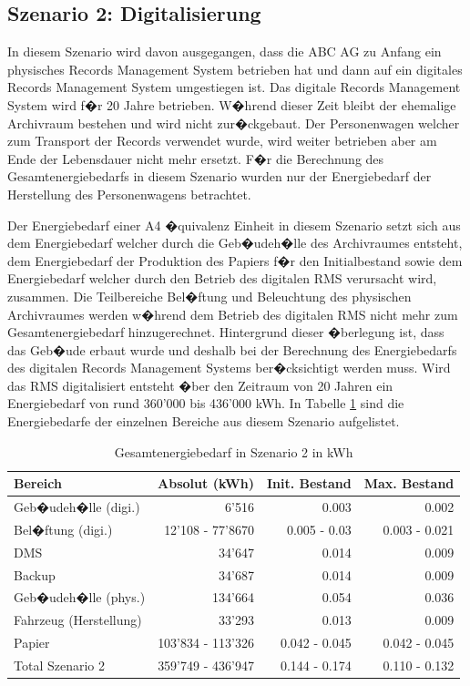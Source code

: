\documentclass[a4paper,twoside,10pt]{report}
\begin{document}
\subsection{Szenario 2: Digitalisierung}
In diesem Szenario wird davon ausgegangen, dass die ABC AG zu Anfang ein physisches Records Management System betrieben hat und dann auf ein digitales Records Management System umgestiegen ist. Das digitale Records Management System wird f�r 20 Jahre betrieben. W�hrend dieser Zeit bleibt der ehemalige Archivraum bestehen und wird nicht zur�ckgebaut. Der Personenwagen welcher zum Transport der Records verwendet wurde, wird weiter betrieben aber am Ende der Lebensdauer nicht mehr ersetzt. F�r die Berechnung des Gesamtenergiebedarfs in diesem Szenario wurden nur der Energiebedarf der Herstellung des Personenwagens betrachtet.

Der Energiebedarf einer A4 �quivalenz Einheit in diesem Szenario setzt sich aus dem Energiebedarf welcher durch die Geb�udeh�lle des Archivraumes entsteht, dem Energiebedarf der Produktion des Papiers f�r den Initialbestand sowie dem Energiebedarf welcher durch den Betrieb des digitalen \ac{RMS} verursacht wird, zusammen. Die Teilbereiche Bel�ftung und Beleuchtung des physischen Archivraumes werden w�hrend dem Betrieb des digitalen \ac{RMS} nicht mehr zum Gesamtenergiebedarf hinzugerechnet. Hintergrund dieser �berlegung ist, dass das Geb�ude erbaut wurde und deshalb bei der Berechnung des Energiebedarfs des digitalen Records Management Systems ber�cksichtigt werden muss. Wird das \ac{RMS} digitalisiert entsteht �ber den Zeitraum von 20 Jahren ein Energiebedarf von rund 360'000 bis 436'000 kWh. In Tabelle \ref{tab:ges_energ_szen2} sind die Energiebedarfe der einzelnen Bereiche aus diesem Szenario aufgelistet.

\begin{table} [h]
	\begin{tabular}{l|r|r|r}
	\hline
	\textbf{Bereich} & \textbf{Absolut (kWh)} & \textbf{Init. Bestand} & \textbf{Max. Bestand}\\
	\hline
	Geb�udeh�lle (digi.) 	& 6'516 						&	0.003 				& 0.002\\
	Bel�ftung	(digi.)			&	12'108 - 77'8670	&	0.005 - 0.03 	& 0.003 - 0.021\\
	DMS									 	& 34'647 						& 0.014  				& 0.009\\
	Backup								& 34'687						&	0.014 				&	0.009 \\
	Geb�udeh�lle (phys.) 	& 134'664 					& 0.054 				& 0.036\\
	Fahrzeug (Herstellung)&	33'293						&	0.013					&	0.009 \\
	Papier 								& 103'834 - 113'326 & 0.042 - 0.045 & 0.042 - 0.045\\
	\hline
	\hline
	Total Szenario 2  		& 359'749 - 436'947 &	0.144 - 0.174 & 0.110 - 0.132 \\
	\hline
	\end{tabular}
\caption{Gesamtenergiebedarf in Szenario 2 in kWh} 
\label{tab:ges_energ_szen2}
\end{table}
\end{document}
